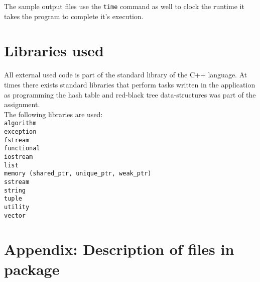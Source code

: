 \documentclass[a4paper]{article}
\begin{document}
The sample output files use the \texttt{time} command as well to clock the runtime it takes the program to complete it's execution.

\section{Libraries used}

All external used code is part of the standard library of the C++ language. At times there exists standard libraries that perform tasks written in the application as programming the hash table and red-black tree data-structures was part of the assignment.\\

The following libraries are used:\\
\texttt{algorithm\\exception\\fstream\\functional\\iostream\\list\\memory (shared\_ptr, unique\_ptr, weak\_ptr)\\sstream\\string\\tuple\\utility\\vector}

\section{Appendix: Description of files in package}
\end{document}
